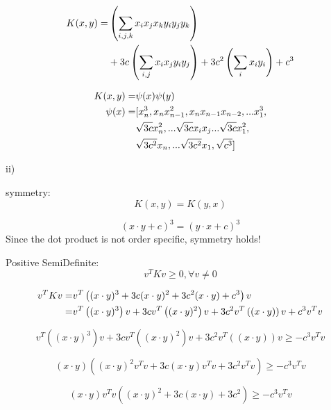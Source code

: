 \documentclass[12pt]{article}
\begin{document}
\begin{align}
   K(x,y) =& \left(\sum_{i,j,k} x_ix_jx_ky_iy_jy_k\right) \notag \\
   &+ 3c\left(\sum_{i,j} x_ix_jy_iy_j\right) + 3c^2\left(\sum_i x_iy_i\right) + c^3
\end{align}

\begin{align}
    K(x,y) =& \psi(x)\psi(y) \notag \\
    \psi(x) =& [x_n^3,x_nx_{n-1}^2,x_nx_{n-1}x_{n-2},...x_1^3, \notag \\
    &\sqrt{3c}x_n^2,...\sqrt{3c}x_ix_j...\sqrt{3c}x_1^2, \notag \\
    &\sqrt{3c^2}x_n,...\sqrt{3c^2}x_1,\sqrt{c^3}]
\end{align}

ii)

symmetry: 
\begin{equation}
    K(x,y) = K(y,x) 
\end{equation}

\begin{equation}
    (x\cdot y + c)^3 = (y\cdot x + c)^3
\end{equation}
Since the dot product is not order specific, symmetry holds! 

Positive SemiDefinite: 
\begin{equation}
    v^T K v \geq 0, \forall v\neq 0
\end{equation}

\begin{align}
    v^T K v =& v^T\left((x \cdot y)^3  + 3c(x \cdot y)^2 + 3c^2(x \cdot y) + c^3\right)v \notag \\
    =& v^T\left((x \cdot y)^3\right)v + 3cv^T\left((x \cdot y)^2\right)v  + 3c^2v^T\left((x \cdot y)\right)v + c^3v^Tv
\end{align}

\begin{equation}
    v^T\left((x \cdot y)^3\right)v + 3cv^T\left((x \cdot y)^2\right)v  + 3c^2v^T\left((x \cdot y)\right)v \geq -c^3v^Tv
\end{equation}

\begin{equation}
    (x \cdot y)\left((x \cdot y)^2v^Tv + 3c(x \cdot y)v^Tv  + 3c^2v^Tv\right) \geq -c^3v^Tv
\end{equation}

\begin{equation}
    (x \cdot y)v^Tv\left((x \cdot y)^2 + 3c(x \cdot y)  + 3c^2\right) \geq -c^3v^Tv
\end{equation}
\end{document}
